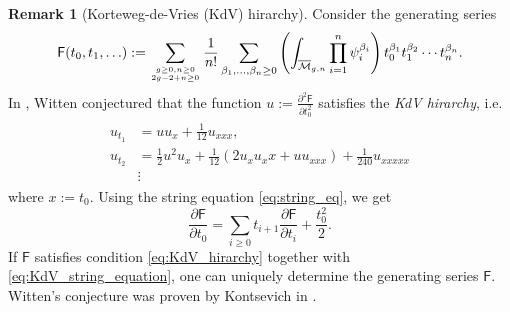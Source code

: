 \documentclass[11pt,colorinlistoftodos]{amsart}
\numberwithin{equation}{subsection}
\theoremstyle{plain}
\theoremstyle{definition}
\newtheorem{rem}[thm]{Remark}
\theoremstyle{remark}
\DeclareMathOperator{\Hom}{Hom}
\newcommand{\de}{\partial}
\newcommand{\calM}{\mathcal{M}}
\begin{document}
\begin{rem}[Korteweg-de-Vries (KdV) hirarchy]
\label{rem:Witten_conjecture}
Consider the generating series 
\begin{equation}
    \label{eq:generating_series_KdV}
    \mathsf{F}(t_0,t_1,\ldots):=\sum_{g\geq 0,n\geq0\atop 2g-2+n\geq 0}\frac{1}{n!}\sum_{\beta_1,\ldots,\beta_n\geq 0}\left(\int_{\overline{\calM}_{g,n}}\prod_{i=1}^n\psi_i^{\beta_i}\right)t_0^{\beta_1}t_1^{\beta_2}\dotsm t_n^{\beta_n}.
\end{equation}
In \cite{Witten1991}, Witten conjectured that the function $u:=\frac{\de^2\mathsf{F}}{\de t_0^2}$ satisfies the \emph{KdV hirarchy}, i.e. 
\begin{align}
\begin{split}
\label{eq:KdV_hirarchy}
    u_{t_1}&=uu_x+\frac{1}{12}u_{xxx},\\
    u_{t_2}&=\frac{1}{2}u^2u_x+\frac{1}{12}(2u_xu_xx+uu_{xxx})+\frac{1}{240}u_{xxxxx}\\
    &\vdots
\end{split}
\end{align}
where $x:=t_0$. Using the string equation \eqref{eq:string_eq}, we get 
\begin{equation}
\label{eq:KdV_string_equation}
\frac{\de\mathsf{F}}{\de t_0}=\sum_{i\geq 0}t_{i+1}\frac{\de\mathsf{F}}{\de t_i}+\frac{t_0^2}{2}.
\end{equation}
If $\mathsf{F}$ satisfies condition \eqref{eq:KdV_hirarchy} together with \eqref{eq:KdV_string_equation}, one can uniquely determine the generating series $\mathsf{F}$. Witten's conjecture was proven by Kontsevich in \cite{Kontsevich1992}.
\end{rem}






\end{document}
